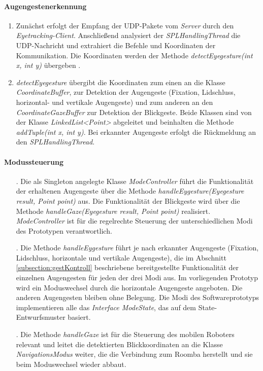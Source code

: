 \paragraph{Augengestenerkennung}
\begin{enumerate}
\item Zunächst erfolgt der Empfang der UDP-Pakete vom \textit{\iV Server} durch den \textit{Eyetracking-Client}. Anschließend analysiert der \textit{SPLHandlingThread} die UDP-Nachricht und extrahiert die Befehle und Koordinaten der Kommunikation. Die Koordinaten werden der Methode \textit{detectEyegesture(int x, int y)} übergeben \cite[S.44]{Eidam2015}. 
\item \textit{detectEyegesture} übergibt die Koordinaten zum einen an die Klasse \textit{CoordinateBuffer}, zur Detektion der Augengeste (Fixation, Lidschluss, horizontal- und vertikale Augengeste) und zum anderen an den \textit{CoordinateGazeBuffer} zur Detektion der Blickgeste. Beide Klassen sind von der Klasse \textit{LinkedList<Point>} abgeleitet und beinhalten die Methode \textit{addTuple(int x, int y)}. Bei erkannter Augengeste erfolgt die Rückmeldung an den \textit{SPLHandlingThread}.
\end{enumerate}

\paragraph{Modussteuerung}
\begin{enumerate}
\setcounter{enumi}{3}
\setcounter{enumii}{1}
\item[\arabic{enumi}.] Die als Singleton angelegte Klasse \textit{ModeController} führt die Funktionalität der erhaltenen Augengeste über die Methode \textit{handleEygesture(Eyegesture result, Point point)} aus. Die Funktionalität der Blickgeste wird über die Methode \textit{handleGaze(Eyegesture result, Point point)} realisiert. \textit{ModeController} ist für die regelrechte Steuerung der unterschiedlichen Modi des Prototypen verantwortlich.
\item[\arabic{enumi}\alph{enumii}.]  Die Methode \textit{handleEygesture} führt je nach erkannter Augengeste (Fixation, Lidschluss, horizontale und vertikale Augengeste), die im Abschnitt \ref{subsection:gestKontroll} beschriebene bereitgestellte Funktionalität der einzelnen Augengesten für jeden der drei Modi aus. Im vorliegenden Prototyp wird ein Moduswechsel durch die horizontale Augengeste angeboten. Die anderen Augengesten bleiben ohne Belegung. Die Modi des Softwareprototyps implementieren alle das \textit{Interface ModeState}, das auf dem State-Entwurfsmuster basiert. 
\setcounter{enumi}{3}
\setcounter{enumii}{2}
\item [\arabic{enumi}\alph{enumii}.] Die Methode \textit{handleGaze} ist für die Steuerung des mobilen Roboters relevant und leitet die detektierten Blickkoordinaten an die Klasse \textit{NavigationsModus} weiter, die die Verbindung zum Roomba herstellt und sie beim Moduswechsel wieder abbaut. 
\end{enumerate}

